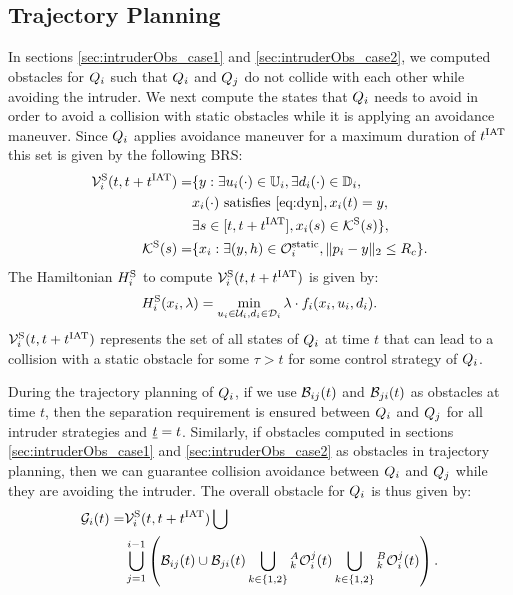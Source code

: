 \subsection{Trajectory Planning} \label{sec:path_planning}
In sections \ref{sec:intruderObs_case1} and \ref{sec:intruderObs_case2}, we computed obstacles for $Q_i$ such that $Q_i$ and $Q_j$ do not collide with each other while avoiding the intruder. We next compute the states that $Q_i$ needs to avoid in order to avoid a collision with static obstacles while it is applying an avoidance maneuver. Since $Q_i$ applies avoidance maneuver for a maximum duration of $t^\text{IAT}$ this set is given by the following BRS:
\begin{equation} \label{eq:ObsBRS_static}
\begin{aligned}
\brs^{\text{S}}_{i}(t, t+\iat) = & \{y: \exists \ctrl_i(\cdot) \in \cfset_i, \exists \dstb_i(\cdot) \in \dfset_i, \\
& \state_i(\cdot) \text{ satisfies \eqref{eq:dyn}}, \state_i(t) = y, \\
& \exists s \in [t, t+\iat], \state_i(s) \in \mathcal{K}^{\text{S}}(s) \},\\
\mathcal{K}^{\text{S}}(s) = & \{\state_i: \exists (y, h) \in \soset_i, \|\pos_i - y\|_2 \le \rc \}.
\end{aligned}
\end{equation}
The Hamiltonian $H^{\text{S}}_{i}$ to compute $\mathcal{V}^{\text{S}}_{i}(t, t+t^\text{IAT})$ is given by:
\begin{equation} \label{eqn:BRS_obsham_static}
\ham^{\text{S}}_{i}(\state_i, \costate) = \min_{\ctrl_i \in \cset_i, \dstb_i \in \dset_i} \costate \cdot f_i (\state_i, \ctrl_i, \dstb_i).
\end{equation}
$\mathcal{V}^{\text{S}}_{i}(t, t+t^\text{IAT})$ represents the set of all states of $Q_i$ at time $t$ that can lead to a collision with a static obstacle for some $\tau > t$ for some control strategy of $Q_i$.

During the trajectory planning of $Q_i$, if we use $\mathcal{B}_{ij}(t)$ and $\mathcal{B}_{ji}(t)$ as obstacles at time $t$, then the separation requirement is ensured between $Q_i$ and $Q_j$ for all intruder strategies and $\underline{t} = t$. Similarly, if obstacles computed in sections \ref{sec:intruderObs_case1} and \ref{sec:intruderObs_case2} as obstacles in trajectory planning, then we can guarantee collision avoidance between $Q_i$ and $Q_j$ while they are avoiding the intruder. The overall obstacle for $Q_i$ is thus given by:
\begin{equation} \label{eq:obsseti_intr}
\begin{aligned}
\obsset_i(t)  =  & \brs^{\text{S}}_{i}(t, t+\iat) \bigcup \\
& \bigcup_{j=1}^{i-1} \left( \buff_{ij}(t) \cup \buff_{ji}(t) \bigcup_{k \in\{1, 2\}} {}_k^A\ioset_i^j(t) \bigcup_{k \in\{1, 2\}} {}_k^B\ioset_i^j(t) \right).
\end{aligned}
\end{equation}


